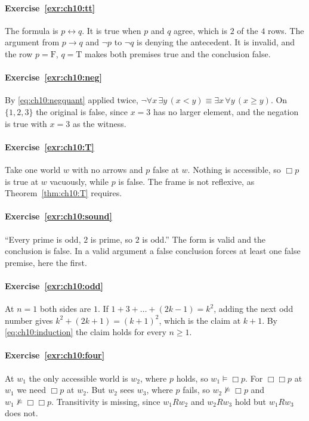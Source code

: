 
\paragraph{Exercise~\ref{exr:ch10:tt}}
The formula is $p\leftrightarrow q$. It is true when $p$ and $q$ agree, which is $2$ of the $4$ rows. The argument from $p\to q$ and $\neg p$ to $\neg q$ is denying the antecedent. It is invalid, and the row $p=\mathrm{F}$, $q=\mathrm{T}$ makes both premises true and the conclusion false.

\paragraph{Exercise~\ref{exr:ch10:neg}}
By \eqref{eq:ch10:negquant} applied twice, $\neg\forall x\,\exists y\,(x<y)\equiv\exists x\,\forall y\,(x\ge y)$. On $\{1,2,3\}$ the original is false, since $x=3$ has no larger element, and the negation is true with $x=3$ as the witness.

\paragraph{Exercise~\ref{exr:ch10:T}}
Take one world $w$ with no arrows and $p$ false at $w$. Nothing is accessible, so $\Box p$ is true at $w$ vacuously, while $p$ is false. The frame is not reflexive, as Theorem~\ref{thm:ch10:T} requires.

\paragraph{Exercise~\ref{exr:ch10:sound}}
``Every prime is odd, $2$ is prime, so $2$ is odd.'' The form is valid and the conclusion is false. In a valid argument a false conclusion forces at least one false premise, here the first.

\paragraph{Exercise~\ref{exr:ch10:odd}}
At $n=1$ both sides are $1$. If $1+3+\dots+(2k-1)=k^2$, adding the next odd number gives $k^2+(2k+1)=(k+1)^2$, which is the claim at $k+1$. By \eqref{eq:ch10:induction} the claim holds for every $n\ge1$.

\paragraph{Exercise~\ref{exr:ch10:four}}
At $w_1$ the only accessible world is $w_2$, where $p$ holds, so $w_1\models\Box p$. For $\Box\Box p$ at $w_1$ we need $\Box p$ at $w_2$. But $w_2$ sees $w_3$, where $p$ fails, so $w_2\not\models\Box p$ and $w_1\not\models\Box\Box p$. Transitivity is missing, since $w_1Rw_2$ and $w_2Rw_3$ hold but $w_1Rw_3$ does not.


